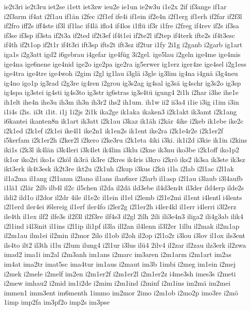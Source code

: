 {ie2t3ri
ie2t3ru
iet2se
i1ett
iet3zw
ieu2e
ie1un
ie2w3u
i1e2x
2if
if3ange
if1ar
i2f3arm
if4at
i2f1au
if1än
i2fec
i2f1ef
ife4i
if1ein
if2e4n
i2f1erg
if1erh
if2far
if2f3l
if2fro
iff2s
iff4ste
if3l
if1lac
if4lä
iflo4
if4los
i1flü
if3r
i1fre
i2freg
if4rev
if2s
if3sa
if3se
if3sp
if3sta
if2t3a
if2ted
if2t3ef
if4t1ei
if2te2l
if2tep
if4terk
ifte2s
if4t3esc
if4th
if2t1op
if2t1r
if4t3ri
ift3sp
ifts2t
ift3sz
if2tur
i1fy
2i1g
i2ganb
i2garb
ig1art
iga1s
i2g3att
igd2
i6gebrau
i4gefar
ige4füg
3i2gel.
ige5lau
i2geln
ige4me
ige4mis
ige4na
ige6nene
ige4nid
ige2o
ige2pa
ige2ra
ig5erwer
ig1erz
iger4ze
ige4sel
i2g1ess
ige4tra
ige4tre
ige4woh
i2gim
i2gl
ig1lau
i3glä
i3gle
ig3lim
ig4na
i4gnä
i3g4neu
ig4no
igo1p
ig3rad
i2g3re
ig4ren
i2grou
ig3s2ag
ig4sal
ig3sä
ig4schr
ig3s2o
ig3sp
ig4spa
ig3stei
ig4sti
ig4s3to
ig3str
ig6stras
ig3s4tü
igung4
2i1h
i2har
i3he
ihe1e
ih1elt
ihe4n
ihe3u
ih3m
ih3n
ih3r2
ihs2
ih1um.
ih1w
ii2
ii3a4
i1ie
i3ig
i1im
i3in
i1i4s
i2is.
ii3t
i1it.
i1j
1i2js
2i1k
ika2ge
ik1aka
ikaken3
i2k1akt
ik3amt
i2k1ang
i6kantei
ikanten8n
ik1art
ik3att
i2k1au
i3kaz
ik1äh
i2kär
4ike
i2keb
ik1ebe
ike2c
i2k1ed
i2k1ef
i2k1ei
ike4l1
ike2n1
ik1en2s
ik1ent
ike2ra
i2k1e4r2e
i2k1er2f
i5kerfam
i2k1er2h
i2ker2l
i2kero
i2ke3ru
i2k1eta
4iki
i3ki.
ik1i2d
i3kie
ik1in
i2kins
iki1s
i2k3l
ik4län
i3k4leri
i3k4let
ik4lim
i3klu
i2kne
ik3nu
iko3be
i2k1off
iko1p2
ik1or
iko2ri
iko1s
i2köl
ik3rä
ik3re
i2kres
ik4ris
i3kro
i2krö
iks2
ik3sa
ik3ste
ik3sz
ikt3erk
ik4t3esk
ik2t3re
ikt2u
i2k1uh
i2kup
i3kus
i2kü
i1la
i2lab
i2l1ac
i2l1ak
il1a2ma
il1ang
i2l1anm
i2lano
il1ans
ilan6zer
i2larb
il1asp
i2l1au
i3laub
i3l4aufb
i1lä1
i2lär
2ilb
ilb4l
il2c
il5chen
il2da
il2dä
ild3ebe
il4d3en4t
il3der
ild4erp
ilde2s
ildi2
ild1o
il2dor
il2dr
4ile
il1e2c
il1ein
il1el
i2lemb
i2l1e2mi
il1ent
i4lentl
i4lents
i2l1erd
iler4ei
i6lereig
il1erf
iler4fo
i2ler2g
i2l1er2h
i4ler4kl
il1err
i4lerri
i3l2erz
ile4th
il1ex
ilf2
ilfe3s
il2f3l
il2f3re
ilf4s3
il2gl
2ilh
2ili
ili3e4n3
iliga2
ili4g3ab
ilik4
i2l1ind
i4l3init
il1ins
i2l1ip
ili1pf
il3la
ill2an
il4lenn
il3l2er
1illu
il2mak
il2m1ap
il2m1au
ilm1ei
il2min
il2mor
2ilo
il1ob
il2oh
il2op
i2l1o2r
i3lou
i3lov
il1ox
ils3ent
ils4to
ilt2
il3th
i1lu
i2lum
ilung4
i2l1ur
i3lus
ilü4
2ilv4
il2zar
il2zau
ilz3erk
il2zwa
imad2
ima1i
im2al
i2m3anh
im1ans
i2marc
im3aren
i2m1arm
i2m1art
im2as
im4at
ima2tr
imat5sc
ima4tur
im1aus
i2maut
im3b
1imbi
i2meg
im1ein
i2mej
i2mek
i2mele
i2melf
im2en
i2m1er2f
i2m1er2l
i2m1er2z
i4me3sh
imes3s
i2meti
i2mew
imhau2
i2mid
im1i2de
i2mim
i2m1ind
i2minf
i2m1ins
im2mä
im2mei
immen1
imm3ent
im6menth
1immo
im2mor
2imo
i2m1ob
i2mo2p
imo3re
i2mö
1imp
imp2fa
im3pf2o
imp2s
im3pse
}
